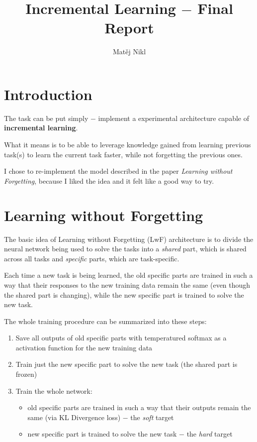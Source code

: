 \documentclass[a4paper,twocolumn]{article}
\title{Incremental Learning $-$ Final Report} \author{Matěj Nikl}
\begin{document}
 \maketitle


\section{Introduction}
The task can be put simply $-$ implement a experimental architecture capable of
\textbf{incremental learning}.

What it means is to be able to leverage knowledge gained from learning previous
task(s) to learn the current task faster, while not forgetting the previous
ones.

I chose to re-implement the model described in the paper \textit{Learning
without Forgetting}, because I liked the idea and it felt like a good way to
try.

\section{Learning without Forgetting}
The basic idea of Learning without Forgetting (LwF) architecture is to divide
the neural network being used to solve the tasks into a \textit{shared} part,
which is shared across all tasks and \textit{specific} parts, which are
task-specific.

Each time a new task is being learned, the old specific parts are trained in
such a way that their responses to the new training data remain the same (even
though the shared part is changing), while the new specific part is trained to
solve the new task.

The whole training procedure can be summarized into these steps:
\begin{enumerate}
    \item Save all outputs of old specific parts with temperatured softmax as a
        activation function for the new training data
    \item Train just the new specific part to solve the new task (the shared
        part is frozen)
    \item Train the whole network:
        \begin{itemize}
            \item old specific parts are trained in such a way that their
                outputs remain the same (via KL Divergence loss) $-$ the
                \textit{soft} target
            \item new specific part is trained to solve the new task $-$ the
                \textit{hard} target
        \end{itemize}
\end{enumerate}
\end{document}
